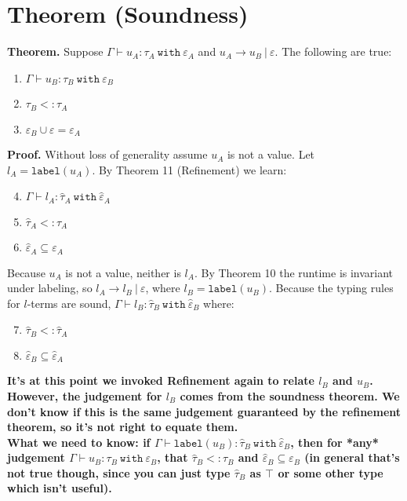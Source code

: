 \documentclass{llncs}
\newcommand{\keywadj}[1]{\mathtt{#1}}
\newcommand{\keyw}[1]{\keywadj{#1}~}
\newcommand{\kwa}[1]{\keywadj{ #1 }}
\newcommand{\type}[2]{
	#1~\keyw{with} #2
}
\begin{document}
\section{Theorem (Soundness)}

\textbf{Theorem.} Suppose $\Gamma \vdash u_A : \type{\tau_A}{\varepsilon_A}$ and $u_A \longrightarrow u_B~|~\varepsilon$. The following are true:
\begin{enumerate}
	\item $\Gamma \vdash u_B : \type{\tau_B}{\varepsilon_B}$
	\item $\tau_B <: \tau_A$
	\item $\varepsilon_B \cup \varepsilon = \varepsilon_A$
	\end{enumerate}

\noindent
\textbf{Proof.} Without loss of generality assume $u_A$ is not a value. Let $l_A = \kwa{label}(u_A)$. By Theorem 11 (Refinement) we learn:
\begin{enumerate}
  \setcounter{enumi}{3}
  \item $\Gamma \vdash l_A : \type{\hat \tau_A}{\hat \varepsilon_A}$
  \item $\hat \tau_A <: \tau_A$
  \item $\hat \varepsilon_A \subseteq \varepsilon_A$
\end{enumerate}
 
\noindent
Because $u_A$ is not a value, neither is $l_A$. By Theorem 10 the runtime is invariant under labeling, so $l_A \longrightarrow l_B~|~\varepsilon$, where $l_B = \kwa{label}(u_B)$. Because the typing rules for $l$-terms are sound, $\Gamma \vdash l_B : \type{\hat \tau_B}{\hat \varepsilon_B}$ where:

\begin{enumerate}
  \setcounter{enumi}{6}
	\item $\hat \tau_B <: \hat \tau_A$
	\item $\hat \varepsilon_B \subseteq \hat \varepsilon_A$
\end{enumerate}

\noindent
\textbf{It's at this point we invoked Refinement again to relate $l_B$ and $u_B$. However, the judgement for $l_B$ comes from the soundness theorem. We don't know if this is the same judgement guaranteed by the refinement theorem, so it's not right to equate them.}\\

\noindent
\textbf{What we need to know: if $\Gamma \vdash \kwa{label}(u_B) : \type{\hat \tau_B}{\hat \varepsilon_B}$, then for *any* judgement $\Gamma \vdash u_B : \type{\tau_B}{\varepsilon_B}$, that $\hat \tau_B <: \tau_B$ and $\hat \varepsilon_B \subseteq \varepsilon_B$ (in general that's not true though, since you can just type $\hat \tau_B$ as $\top$ or some other type which isn't useful). }
\end{document}
